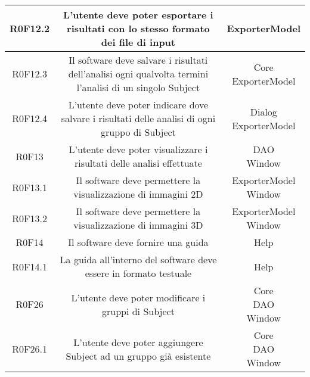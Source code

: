 \begin{center}
\begin{longtable}{|c|c|c|}
\hline
R0F12.2   & \parbox[t]{\larghezza}{L'utente deve poter esportare i risultati con lo stesso formato dei file di input}  & \parbox[t]{\dimFonti}{ ExporterModel \\} \\
\hline
R0F12.3   & \parbox[t]{\larghezza}{Il software deve salvare i risultati dell'analisi ogni qualvolta termini l'analisi di un singolo Subject}  & \parbox[t]{\dimFonti}{ Core \\ ExporterModel \\} \\
\hline
R0F12.4   & \parbox[t]{\larghezza}{L'utente deve poter indicare dove salvare i risultati delle analisi di ogni gruppo di Subject}  & \parbox[t]{\dimFonti}{ Dialog \\ ExporterModel \\} \\
\hline
R0F13   & \parbox[t]{\larghezza}{L'utente deve poter visualizzare i risultati delle analisi effettuate}  & \parbox[t]{\dimFonti}{ DAO \\ Window \\} \\
\hline
R0F13.1   & \parbox[t]{\larghezza}{Il software deve permettere la visualizzazione di immagini 2D}  & \parbox[t]{\dimFonti}{ ExporterModel \\ Window \\} \\
\hline
R0F13.2   & \parbox[t]{\larghezza}{Il software deve permettere la visualizzazione di immagini 3D}  & \parbox[t]{\dimFonti}{ ExporterModel \\ Window \\} \\
\hline
R0F14   & \parbox[t]{\larghezza}{Il software deve fornire una guida}  & \parbox[t]{\dimFonti}{ Help \\} \\
\hline
R0F14.1   & \parbox[t]{\larghezza}{La guida all'interno del software deve essere in formato testuale}  & \parbox[t]{\dimFonti}{ Help \\} \\
\hline
R0F26   & \parbox[t]{\larghezza}{L'utente deve poter modificare i gruppi di Subject}  & \parbox[t]{\dimFonti}{ Core \\ DAO \\ Window \\} \\
\hline
R0F26.1   & \parbox[t]{\larghezza}{L'utente deve poter aggiungere Subject ad un gruppo già esistente}  & \parbox[t]{\dimFonti}{ Core \\ DAO \\ Window \\} \\

\end{longtable}
\end{center}
